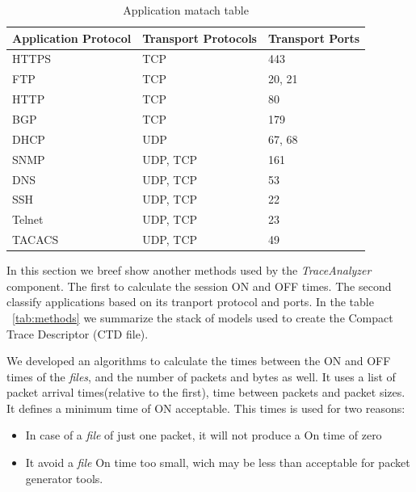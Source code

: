 \begin{table}[ht!]
	\centering
	\caption{Application matach table}
	\label{tab:application-protocols}
	\begin{tabular}{lll}
		\hline
		Application Protocol & Transport Protocols & Transport Ports \\ \hline
		HTTPS               & TCP                & 443             \\
		FTP                 & TCP                & 20, 21          \\
		HTTP                & TCP                & 80              \\
		BGP                 & TCP                & 179             \\
		DHCP                & UDP                & 67, 68          \\
		SNMP                & UDP, TCP           & 161             \\
		DNS                 & UDP, TCP           & 53              \\
		SSH                 & UDP, TCP           & 22              \\
		Telnet              & UDP, TCP           & 23              \\
		TACACS              & UDP, TCP           & 49              \\ \hline
	\end{tabular}
\end{table}




In this section we breef show another methods used by the \textit{TraceAnalyzer} component. The first to calculate the session ON and OFF times. The second classify applications based on its tranport protocol and ports. In the table ~\ref{tab:methods} we summarize the stack of models used to create the Compact Trace Descriptor (CTD file). 



We developed an algorithms to calculate the times between the ON and OFF times of the \textit{files}, and the number of packets and bytes as well. It uses a list of packet arrival times(relative to the first), time between packets and packet sizes. It defines a minimum time of ON acceptable. This times is used for two reasons:

\begin{itemize}
\item In case of a \textit{file} of just one packet, it will not produce a On time of zero
\item It avoid a \textit{file} On time too small, wich may be less than acceptable for packet generator tools.
\end{itemize}

